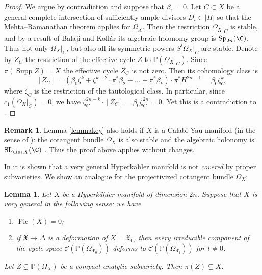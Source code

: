 \documentclass[JEP,XML,SOM,Unicode,NoEqCountersInSection,published]{cedram}
\let\mathcal\mathscr
\theoremstyle{plain}
\newtheorem{lemma}[theorem]{Lemma}
\theoremstyle{definition}
\newtheorem{remark}[theorem]{Remark}
\newcommand{\PP}{\ensuremath{\mathbb{P}}}
\newcommand{\chow}[1]{\ensuremath{\mathcal{C}(#1)}}
\DeclareMathOperator{\pic}{Pic}
\DeclareMathOperator{\supp}{Supp}
\begin{document}
\begin{proof}
We argue by contradiction and suppose that $\beta_1=0$. Let $C \subset X$ be a general complete intersection
of sufficiently ample divisors $D_i \in | H |$ so that the Mehta--Ramanathan theorem \cite[Th.\,4.3]{MR84} applies for $\Omega_X$. Then the restriction $\Omega_X|_C$ is stable, and by a result of Balaji and Kollár \cite[Prop.\,10]{BK08}
its algebraic holonomy group is $\mbox{Sp}_{2n}(\C)$. Thus not only $\Omega_X|_C$, but also all its symmetric
powers $S^l \Omega_X|_C$ are stable. Denote by $Z_C$ the restriction of the effective cycle $Z$
to $\PP(\Omega_X|_C)$.
Since $\pi(\supp Z) = X$ the effective cycle $Z_C$ is not zero.
Then its cohomology class is
\[
[Z_C]= (\beta_0 \zeta^k + \zeta^{k-2}\cdot \pi^* \beta_2 + \ldots + \pi^* \beta_k) \cdot \pi^* H^{2n-1}
= \beta_0 \zeta_C^k,
\]
where $\zeta_C$ is the restriction of the tautological class. In particular, since $c_1(\Omega_X|_C)=0$, we
have $\zeta_C^{2n-k} \cdot [Z_C] = \beta_0 \zeta_C^{2n} = 0$. Yet this is a contradiction to \cite[Prop.\,1.3]{HP19}.
\end{proof}

\begin{remark}
Lemma \ref{lemmakey} also holds if $X$ is a Calabi-Yau manifold (in the sense of \cite{Bea83}): the cotangent bundle
$\Omega_X$ is also stable and the algebraic holonomy is $\mathrm{SL}_{\dim X}(\C)$ \cite[Prop.\,10]{BK08}.
Thus the proof above applies without changes.
\end{remark}

In \cite[Cor.\,2.6]{COP10} it is shown that a very general Hyperkähler manifold is not {\em covered} by proper subvarieties. We show an analogue for the projectivized cotangent bundle $\Omega_X$:

\begin{lemma}\label{lemmanosubvariety}
Let $X$ be a Hyperkähler manifold of dimension $2n$. Suppose that $X$ is very general in the following sense:
we have
\begin{enumerate}
\item $\pic (X)=0$;
\item if $\mathfrak X \to \Delta$ is a deformation of $X=\mathfrak X_0$, then every irreducible component of the
cycle space $\chow{\PP(\Omega_{\mathfrak X_0})}$ deforms to $\chow{\PP(\Omega_{\mathfrak X_t})}$
for $t \neq 0$.
\end{enumerate}
Let $Z \subsetneq \PP(\Omega_X)$ be a compact analytic subvariety.
Then $\pi(Z) \subsetneq X$.
\end{lemma}
\end{document}
